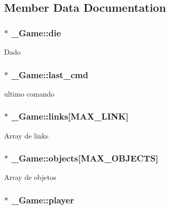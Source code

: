 \subsection{Member Data Documentation}
\hypertarget{struct__Game_a0d6009b5dcb080489c192a9198fa7d46}{
\subsubsection[{die}]{$\ast$ \+\_\+\+Game\+::die}}\label{struct__Game_a0d6009b5dcb080489c192a9198fa7d46}
Dado \hypertarget{struct__Game_a6dd34045346b3ea8dd1a4e3f08ab71c5}{
\subsubsection[{last\+\_\+cmd}]{$\ast$ \+\_\+\+Game\+::last\+\_\+cmd}}\label{struct__Game_a6dd34045346b3ea8dd1a4e3f08ab71c5}
ultimo comando \hypertarget{struct__Game_aa4ff88aaf2a54616e5863609effad94e}{
\subsubsection[{links}]{$\ast$ \+\_\+\+Game\+::links\mbox{[}{\bf M\+A\+X\+\_\+\+L\+I\+N\+K}\mbox{]}}}\label{struct__Game_aa4ff88aaf2a54616e5863609effad94e}
Array de links \hypertarget{struct__Game_ad45bf5645a26e546d0060a2e61f9cf81}{
\subsubsection[{objects}]{$\ast$ \+\_\+\+Game\+::objects\mbox{[}{\bf M\+A\+X\+\_\+\+O\+B\+J\+E\+C\+T\+S}\mbox{]}}}\label{struct__Game_ad45bf5645a26e546d0060a2e61f9cf81}
Array de objetos \hypertarget{struct__Game_a31406605782d71ec00c4bf258ea76267}{
\subsubsection[{player}]{$\ast$ \+\_\+\+Game\+::player}}\label{struct__Game_a31406605782d71ec00c4bf258ea76267}
